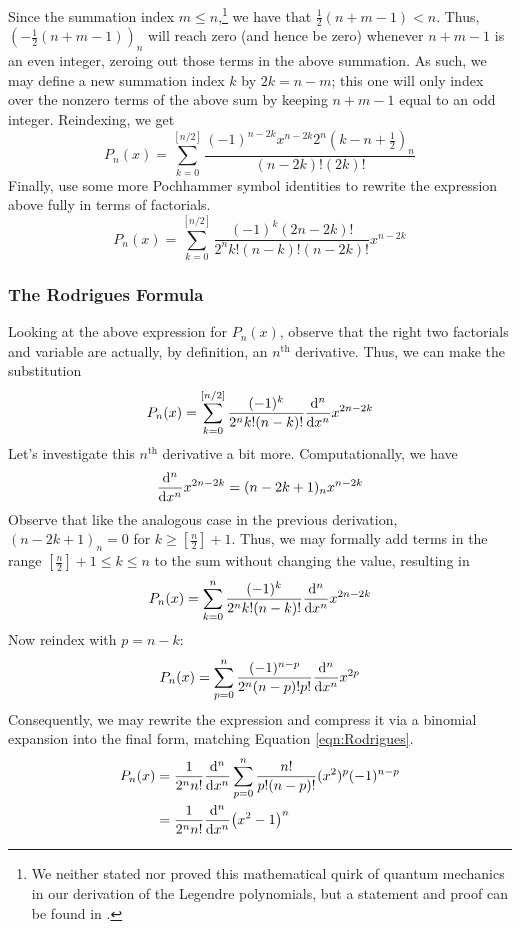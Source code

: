 \documentclass[titlepage]{article}
\numberwithin{equation}{section}
\begin{document}
Since the summation index $m\leq n$,\footnote{We neither stated nor proved this mathematical quirk of quantum mechanics in our derivation of the Legendre polynomials, but a statement and proof can be found in \textcite[32]{bib:FinalProject}.} we have that $\tfrac{1}{2}(n+m-1)<n$. Thus, $(-\tfrac{1}{2}(n+m-1))_n$ will reach zero (and hence be zero) whenever $n+m-1$ is an even integer, zeroing out those terms in the above summation. As such, we may define a new summation index $k$ by $2k=n-m$; this one will only index over the nonzero terms of the above sum by keeping $n+m-1$ equal to an odd integer. Reindexing, we get
\begin{equation*}
    P_n(x) = \sum_{k=0}^{[n/2]}\frac{(-1)^{n-2k}x^{n-2k}2^n\left( k-n+\tfrac{1}{2} \right)_n}{(n-2k)!(2k)!}
\end{equation*}
Finally, use some more Pochhammer symbol identities to rewrite the expression above fully in terms of factorials.
\begin{equation*}
    P_n(x) = \sum_{k=0}^{[n/2]}\frac{(-1)^k(2n-2k)!}{2^nk!(n-k)!(n-2k)!}x^{n-2k}
\end{equation*}

\subsubsection{The Rodrigues Formula}
Looking at the above expression for $P_n(x)$, observe that the right two factorials and variable are actually, by definition, an $n^\text{th}$ derivative. Thus, we can make the substitution
\begin{equation*}
    P_n(x) = \sum_{k=0}^{[n/2]}\frac{(-1)^k}{2^nk!(n-k)!}\dv[n]{x}x^{2n-2k}
\end{equation*}
Let's investigate this $n^\text{th}$ derivative a bit more. Computationally, we have
\begin{equation*}
    \dv[n]{x}x^{2n-2k} = (n-2k+1)_nx^{n-2k}
\end{equation*}
Observe that like the analogous case in the previous derivation, $(n-2k+1)_n=0$ for $k\geq[\tfrac{n}{2}]+1$. Thus, we may formally add terms in the range $[\tfrac{n}{2}]+1\leq k\leq n$ to the sum without changing the value, resulting in
\begin{equation*}
    P_n(x) = \sum_{k=0}^n\frac{(-1)^k}{2^nk!(n-k)!}\dv[n]{x}x^{2n-2k}
\end{equation*}
Now reindex with $p=n-k$:
\begin{equation*}
    P_n(x) = \sum_{p=0}^n\frac{(-1)^{n-p}}{2^n(n-p)!p!}\dv[n]{x}x^{2p}
\end{equation*}
Consequently, we may rewrite the expression and compress it via a binomial expansion into the final form, matching Equation \ref{eqn:Rodrigues}.
\begin{align*}
    P_n(x) &= \frac{1}{2^nn!}\dv[n]{x}\sum_{p=0}^n\frac{n!}{p!(n-p)!}(x^2)^p(-1)^{n-p}\\
    &= \frac{1}{2^nn!}\dv[n]{x}(x^2-1)^n
\end{align*}
\end{document}
